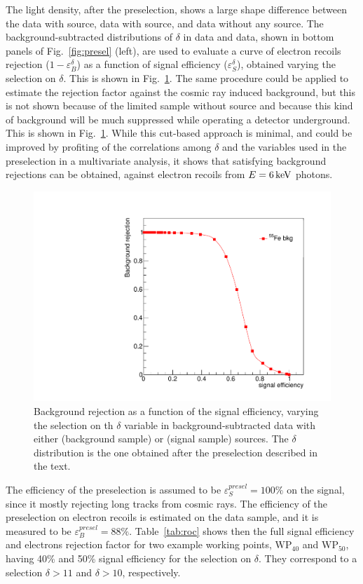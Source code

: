 The light density, after the preselection, shows a large shape
difference between the data with \ambe source, data with \fe source,
and data without any source.  The background-subtracted distributions
of $\delta$ in \ambe data and \fe data, shown in bottom panels of
Fig.~\ref{fig:presel} (left), are used to evaluate a curve of electron
recoils rejection ($1-\varepsilon^\delta_{B}$) as a function of signal
efficiency ($\varepsilon^\delta_{S}$), obtained varying the selection on
$\delta$. This is shown in Fig.~\ref{fig:roc}. The same procedure
could be applied to estimate the rejection factor against the cosmic
ray induced background, but this is not shown because of the limited
sample without source and because this kind of background will be much
suppressed while operating a detector underground. This is shown in
Fig.~\ref{fig:roc}. While this cut-based approach is minimal, and
could be improved by profiting of the correlations among $\delta$ and
the variables used in the preselection in a multivariate analysis, it
shows that satisfying background rejections can be obtained, against
electron recoils from $E=6\,\textrm{ke\hspace{-.08em}V}$ photons.
%
\begin{figure}[ht]
  \begin{center}
  \includegraphics[width=0.45\linewidth]{figures/density_roc}

  \caption{Background rejection as a function of the signal
    efficiency, varying the selection on th $\delta$ variable in
    background-subtracted data with either \fe (background sample) or
    \ambe (signal sample) sources.  The $\delta$ distribution is the
    one obtained after the preselection described in the
    text.  \label{fig:roc}}

  \end{center}
\end{figure}
%

The efficiency of the preselection is assumed to be
$\varepsilon_{S}^{presel}=100\%$ on the signal, since it mostly
rejecting long tracks from cosmic rays. The efficiency of the
preselection on electron recoils is estimated on the \fe data sample,
and it is measured to be
$\varepsilon_{B}^{presel}=88\%$. Table~\ref{tab:roc} shows then the
full signal efficiency and electrons rejection factor for two example
working points, $\mathrm{WP}_{40}$ and $\mathrm{WP}_{50}$, having 40\%
and 50\% signal efficiency for the selection on $\delta$. They
correspond to a selection $\delta>11$ and $\delta>10$, respectively.



